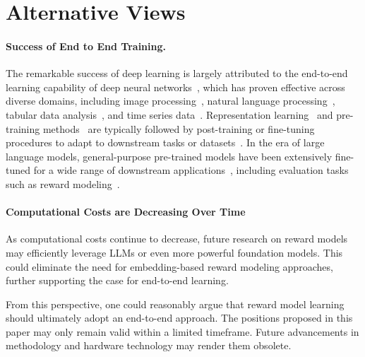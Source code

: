 \section{Alternative Views}
\label{sec:alternative_views}
\paragraph{Success of End to End Training.}

The remarkable success of deep learning is largely attributed to the end-to-end learning capability of deep neural networks~\citep{lecun2015deep,goodfellow2016deep}, which has proven effective across diverse domains, including image processing~\citep{krizhevsky2012imagenet,he2016deep}, natural language processing~\citep{vaswani2017attention,devlin2018bert}, tabular data analysis~\citep{arik2021tabnet}, and time series data~\citep{van2016wavenet,ismail2019deep,ding2020hierarchical}.
Representation learning~\citep{bengio2013representation} and pre-training methods~\citep{radford2018improving} are typically followed by post-training or fine-tuning procedures to adapt to downstream tasks or datasets~\citep{howard2018universal,raffel2020exploring,radford2021learning}. In the era of large language models, general-purpose pre-trained models have been extensively fine-tuned for a wide range of downstream applications~\citep{brown2020language}, including evaluation tasks such as reward modeling~\citep{perez2022red,ouyang2022training,chang2024survey,lin2023llm}.

\paragraph{Computational Costs are Decreasing Over Time}
As computational costs continue to decrease, future research on reward models may efficiently leverage LLMs or even more powerful foundation models. This could eliminate the need for embedding-based reward modeling approaches, further supporting the case for end-to-end learning.

From this perspective, one could reasonably argue that reward model learning should ultimately adopt an end-to-end approach. The positions proposed in this paper may only remain valid within a limited timeframe. Future advancements in methodology and hardware technology may render them obsolete.
